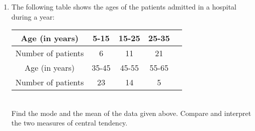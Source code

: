 \renewcommand{\theequation}{\theenumi}
\begin{enumerate}[label=\arabic*.,ref=\thesubsection.\theenumi]
	\item The following table shows the ages of the patients admitted in a hospital during a year:
	\begin{tabular}{|c|c|c|c|c|}
	\hline
	Age (in years) &5-15&15-25&25-35\\
	\hline
	Number of patients&6&11&21\\
	\hline
	Age (in years) &35-45&45-55&55-65\\
	\hline
	Number of patients&23&14&5\\
	\hline
	\end{tabular}\\
	Find the mode and the mean of the data given above. Compare and interpret the two
	measures of central tendency.
\end{enumerate}